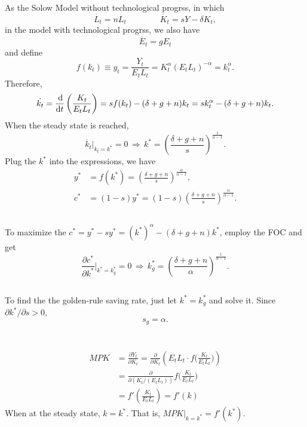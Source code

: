 \documentclass{article}
\newcommand{\kast}{k^\ast}
\begin{document}
\section{}
\subsection{}
As the Solow Model without technological progrss, in which
\[
    \dot{L_t} = n L_t \qquad\qquad
    \dot{K_t} = sY - \delta K_t,
\]
in the model with technological progrss, we also have
\[
    \dot{E_t} = g E_t
\]
and define
\[
    f(k_t) \equiv y_t = \frac{Y_t}{E_t L_t}
    = K_t^\alpha (E_t L_t)^{-\alpha} = k_t^\alpha.
\]
Therefore, 
\[
    \dot{k_t} = \frac{\dif}{\dif t} \left( \frac{K_t}{E_t L_t} \right)
    = s f(k_t) - (\delta + g + n) k_t
    = s k_t^\alpha - (\delta + g + n) k_t.
\]
When the steady state is reached,
\[
    \dot{k_t}|_{k_t = \kast} = 0 \,\Longrightarrow\,
    \kast = \left( \frac{\delta + g + n}{s} \right)^{\frac{1}{\alpha - 1}}.
\]
Plug the $\kast$ into the expressions, we have
\begin{align*}
    y^\ast &= f(\kast) = \left( \frac{\delta + g + n}{s} \right)^{\frac{\alpha}{\alpha - 1}}, \\
    c^\ast &= (1-s) y^\ast = (1-s) \left( \frac{\delta + g + n}{s} \right)^{\frac{\alpha}{\alpha - 1}}.
\end{align*}

\subsection{}
To maximize the $c^\ast = y^\ast - s y^\ast 
= (\kast)^\alpha - (\delta + g + n) \kast$, employ the FOC and get
\[
    \frac{\partial c^\ast}{\partial \kast} \bigg|_{\kast = \kast_g} = 0
    \,\Longrightarrow\,
    \kast_g = \left( \frac{\delta + g + n}{\alpha} \right)^{\frac{1}{\alpha - 1}}.
\]    

\subsection{}
To find the the golden-rule saving rate, just let $\kast = \kast_g$ and solve it. Since $\partial \kast / \partial s > 0$,
\[
    s_g = \alpha.
\]

\section{}
\subsection{}
\begin{align*}
    MPK &= \frac{\partial Y_t}{\partial K_t}
    = \frac{\partial}{\partial K_t} \left(E_t L_t \cdot f\Big( \frac{K_t}{E_t L_t} \Big)\right) \\
    &= \frac{\partial }{\partial (K_t / (E_t L_t))} f\Big( \frac{K_t}{E_t L_t} \Big) \\
    &= f' \left( \frac{K_t}{E_t L_t} \right)
    = f'(k)
\end{align*}
When at the steady state, $k = \kast$. That is, $MPK \big|_{k = \kast} = f'(\kast)$.
\end{document}
